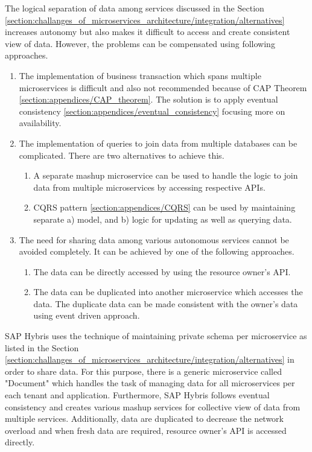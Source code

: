 The logical separation of data among services discussed in the Section \ref{section:challanges_of_microservices_architecture/integration/alternatives} increases autonomy but also makes it difficult to access and create consistent view of data. However, the problems can be compensated using following approaches.\cite{Richardson:2016aa} \cite{Richardson:2015aa}
\begin{enumerate}
\item The implementation of business transaction which spans multiple microservices is difficult and also not recommended because of \acrshort{CAP} Theorem \ref{section:appendices/CAP_theorem}. The solution is to apply eventual consistency \ref{section:appendices/eventual_consistency} focusing more on availability.
\item The implementation of queries to join data from multiple databases can be complicated. There are two alternatives to achieve this.
    \begin{enumerate}
        \item A separate mashup microservice can be used to handle the logic to join data from multiple microservices by accessing respective \acrshort{API}s.
        \item \acrshort{CQRS} pattern \ref{section:appendices/CQRS} can be used by maintaining separate a) model,  and b) logic for updating as well as querying data.
    \end{enumerate}
\item The need for sharing data among various autonomous services cannot be avoided completely. It can be achieved by one of the following approaches.
    \begin{enumerate}
        \item The data can be directly accessed by using the resource owner's \acrshort{API}.
        \item The data can be duplicated into another microservice which accesses the data. The duplicate data can be made consistent with the owner's data using event driven approach.
    \end{enumerate}
\end{enumerate}
\begin{shaded}
SAP Hybris uses the technique of maintaining private schema per microservice as listed in the Section \ref{section:challanges_of_microservices_architecture/integration/alternatives} in order to share data. For this purpose, there is a generic microservice called "Document" which handles the task of managing data for all microservices per each tenant and application. Furthermore, SAP Hybris follows eventual consistency and creates various mashup services for collective view of data from multiple services. Additionally, data are duplicated to decrease the network overload and when fresh data are required, resource owner's \acrshort{API} is accessed directly.
\end{shaded}


